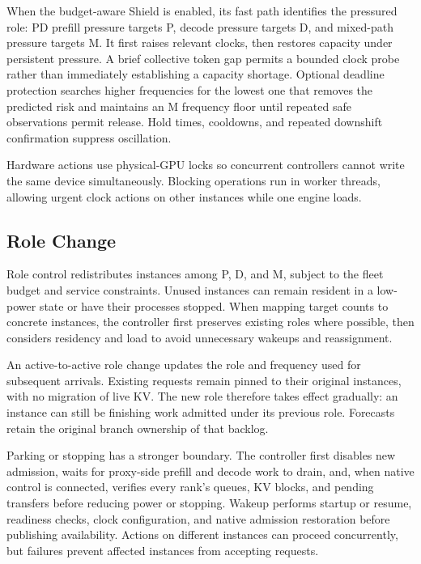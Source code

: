 \documentclass[11pt,a4paper,twocolumn]{article}
\begin{document}
When the budget-aware Shield is enabled, its fast path
identifies the pressured role: PD prefill pressure targets P,
decode pressure targets D, and mixed-path pressure targets M.
It first raises relevant clocks, then restores capacity
under persistent pressure. A brief collective token gap
permits a bounded clock probe rather than immediately
establishing a capacity shortage. Optional deadline
protection searches higher frequencies for the lowest
one that removes the predicted risk and maintains an M
frequency floor until repeated safe observations permit
release. Hold times, cooldowns, and repeated downshift
confirmation suppress oscillation.

Hardware actions use physical-GPU locks so concurrent
controllers cannot write the same device simultaneously.
Blocking operations run in worker threads, allowing urgent
clock actions on other instances while one engine loads.

\subsection{Role Change}

Role control redistributes instances among P, D, and M,
subject to the fleet budget and service constraints.
Unused instances can remain resident in a low-power state
or have their processes stopped. When mapping target counts
to concrete instances, the controller first preserves
existing roles where possible, then considers residency
and load to avoid unnecessary wakeups and reassignment.

An active-to-active role change updates the role and
frequency used for subsequent arrivals. Existing requests
remain pinned to their original instances, with no migration
of live KV. The new role therefore takes effect gradually:
an instance can still be finishing work admitted under its
previous role. Forecasts retain the original branch
ownership of that backlog.

Parking or stopping has a stronger boundary. The controller
first disables new admission, waits for proxy-side prefill
and decode work to drain, and, when native control is
connected, verifies every rank's queues, KV blocks, and
pending transfers before reducing power or stopping.
Wakeup performs startup or resume, readiness checks,
clock configuration, and native admission restoration
before publishing availability. Actions on different
instances can proceed concurrently, but failures prevent
affected instances from accepting requests.
\end{document}

